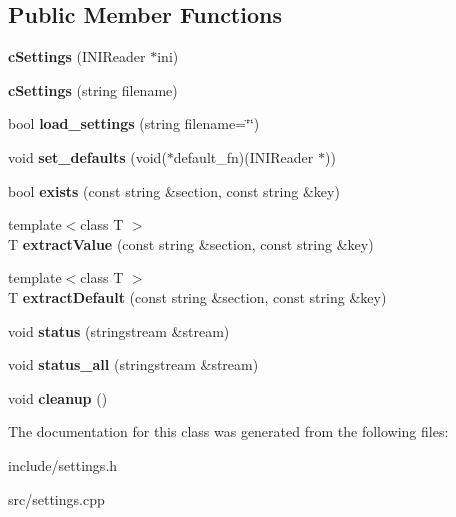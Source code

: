 \subsection*{\-Public \-Member \-Functions}
\begin{DoxyCompactItemize}
\item 
\hypertarget{classcSettings_adb4191f32f2bed59d41bcc4c5d0c6317}{{\bfseries c\-Settings} (\-I\-N\-I\-Reader $\ast$ini)}\label{d0/d75/classcSettings_adb4191f32f2bed59d41bcc4c5d0c6317}

\item 
\hypertarget{classcSettings_aa2d6863d9a56f599b592e4834663dec2}{{\bfseries c\-Settings} (string filename)}\label{d0/d75/classcSettings_aa2d6863d9a56f599b592e4834663dec2}

\item 
\hypertarget{classcSettings_a52944397e64f17ba57573134c7eb9c9d}{bool {\bfseries load\-\_\-settings} (string filename=\char`\"{}\char`\"{})}\label{d0/d75/classcSettings_a52944397e64f17ba57573134c7eb9c9d}

\item 
\hypertarget{classcSettings_a096489fcd36936a5b44772a56e444ac4}{void {\bfseries set\-\_\-defaults} (void($\ast$default\-\_\-fn)(\-I\-N\-I\-Reader $\ast$))}\label{d0/d75/classcSettings_a096489fcd36936a5b44772a56e444ac4}

\item 
\hypertarget{classcSettings_a932a80fa8c18894d813bf16112402f01}{bool {\bfseries exists} (const string \&section, const string \&key)}\label{d0/d75/classcSettings_a932a80fa8c18894d813bf16112402f01}

\item 
\hypertarget{classcSettings_a2a0b1ae7d7d5e60abf092bde42e3b7af}{{\footnotesize template$<$class T $>$ }\\\-T {\bfseries extract\-Value} (const string \&section, const string \&key)}\label{d0/d75/classcSettings_a2a0b1ae7d7d5e60abf092bde42e3b7af}

\item 
\hypertarget{classcSettings_a691bc81e42a54dbd1ec7212284bef316}{{\footnotesize template$<$class T $>$ }\\\-T {\bfseries extract\-Default} (const string \&section, const string \&key)}\label{d0/d75/classcSettings_a691bc81e42a54dbd1ec7212284bef316}

\item 
\hypertarget{classcSettings_ac4ba02418b3ed5b2ce2709c2e6983e5e}{void {\bfseries status} (stringstream \&stream)}\label{d0/d75/classcSettings_ac4ba02418b3ed5b2ce2709c2e6983e5e}

\item 
\hypertarget{classcSettings_a0fb4ea27171811d337c6aca9f4ed873d}{void {\bfseries status\-\_\-all} (stringstream \&stream)}\label{d0/d75/classcSettings_a0fb4ea27171811d337c6aca9f4ed873d}

\item 
\hypertarget{classcSettings_a3878b2abb4176a3ffb7c70a87c4a3ffe}{void {\bfseries cleanup} ()}\label{d0/d75/classcSettings_a3878b2abb4176a3ffb7c70a87c4a3ffe}

\end{DoxyCompactItemize}


\-The documentation for this class was generated from the following files\-:\begin{DoxyCompactItemize}
\item 
include/settings.\-h\item 
src/settings.\-cpp\end{DoxyCompactItemize}
